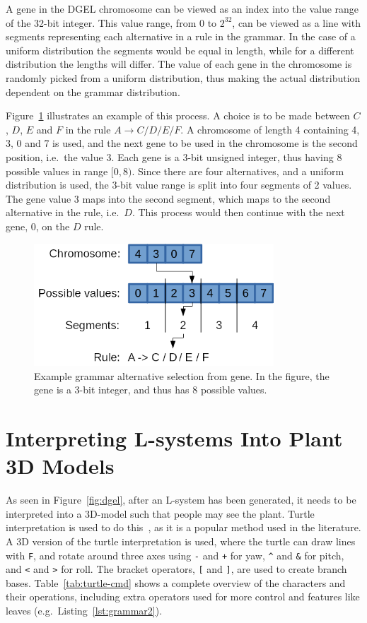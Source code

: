 A gene in the DGEL chromosome can be viewed as an index into the value range of the 32-bit integer.
This value range, from $0$ to $2^{32}$, can be viewed as a line with segments representing each alternative in a rule in the grammar.
In the case of a uniform distribution the segments would be equal in length, while for a different distribution the lengths will differ.
The value of each gene in the chromosome is randomly picked from a uniform distribution, thus making the actual distribution dependent on the grammar distribution.

Figure~\ref{fig:gene} illustrates an example of this process.
A choice is to be made between $C$, $D$, $E$ and $F$ in the rule $A \rightarrow C / D / E / F$.
A chromosome of length 4 containing 4, 3, 0 and 7 is used, and the next gene to be used in the chromosome is the second position, i.e.\ the value 3.
Each gene is a 3-bit unsigned integer, thus having 8 possible values in range $[0, 8)$.
Since there are four alternatives, and a uniform distribution is used, the 3-bit value range is split into four segments of 2 values.
The gene value 3 maps into the second segment, which maps to the second alternative in the rule, i.e.\ $D$.
This process would then continue with the next gene, 0, on the $D$ rule.

\begin{figure}
    \centering
    \includegraphics[width=0.8\textwidth]{figures/gene}
    \caption[Example grammar alternative selection from gene]{Example grammar alternative selection from gene. In the figure, the gene is a 3-bit integer, and thus has 8 possible values.}
    \label{fig:gene}
\end{figure}

\section{Interpreting L-systems Into Plant 3D Models}
\label{sec:interpreting}
As seen in Figure~\ref{fig:dgel}, after an L-system has been generated, it needs to be interpreted into a 3D-model such that people may see the plant.
Turtle interpretation is used to do this~\cite{2012Prusinkiewicz}, as it is a popular method used in the literature.
A 3D version of the turtle interpretation is used, where the turtle can draw lines with \texttt{F}, and rotate around three axes using \texttt{-} and \texttt{+} for yaw, \texttt{\textasciicircum} and \texttt{\&} for pitch, and \texttt{<} and \texttt{>} for roll.
The bracket operators, \texttt{[} and \texttt{]}, are used to create branch bases.
Table~\ref{tab:turtle-cmd} shows a complete overview of the characters and their operations, including extra operators used for more control and features like leaves (e.g.\ Listing~\ref{lst:grammar2}).

